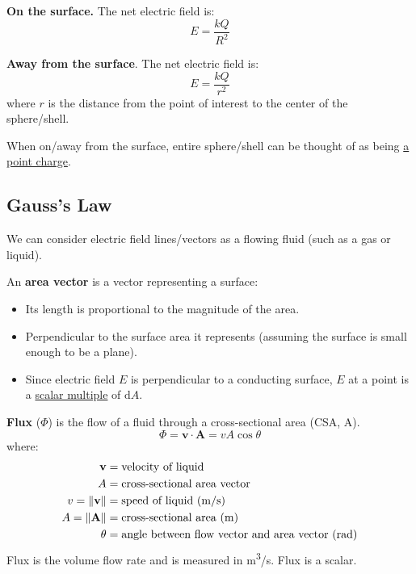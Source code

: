 \documentclass{article}
\newcommand{\definition}[1]{\begin{tcolorbox}[colback=red!5!white,colframe=red!75!black,parbox=false] #1 \end{tcolorbox}}
\newcommand{\theorem}[2]{\begin{tcolorbox}[title={#1},colback=blue!5!white,colframe=blue!75!black,parbox=false] #2 \end{tcolorbox}}
\newcommand{\defitheorem}[2]{\begin{tcolorbox}[title={#1},colback=violet!5!white,colframe=violet!75!black,parbox=false] #2 \end{tcolorbox}}
\begin{document}
\textbf{On the surface.} The net electric field is:
\begin{equation*}
	E=\frac{kQ}{R^2}
\end{equation*}

\textbf{Away from the surface}. The net electric field is:
\begin{equation*}
	E=\frac{kQ}{r^2}
\end{equation*}
where $r$ is the distance from the point of interest to the center of the sphere/shell.

\theorem*{
	When on/away from the surface, entire sphere/shell can be thought of as being \ul{a point charge}.
}

\subsection{Gauss's Law}

We can consider electric field lines/vectors as a flowing fluid (such as a gas or liquid).

\definition{
	An \textbf{area vector} is a vector representing a surface:
	\begin{itemize}
		\item Its length is proportional to the magnitude of the area.
		\item Perpendicular to the surface area it represents (assuming the surface is small enough to be a plane).
		\item Since electric field $E$ is perpendicular to a conducting surface, $E$ at a point is a \ul{scalar multiple} of $\mathrm{d}A$.
	\end{itemize}
}
\defitheorem{Flux}{
	\textbf{Flux} ($\Phi$) is the flow of a fluid through a cross-sectional area (CSA, A).
	\begin{equation*}
	    \Phi=\mathbf v\cdot \mathbf A=vA\cos\theta
	\end{equation*}
	where:
	\begin{align*}
		\mathbf v&=\text{velocity of liquid} \\
		A&=\text{cross-sectional area vector} \\
		v=\lVert \mathbf v \rVert &=\text{speed of liquid (\si{m/s})} \\
		A=\lVert \mathbf A \rVert &=\text{cross-sectional area (\si{m})} \\
		\theta&=\text{angle between flow vector and area vector (\si{\radian})}
	\end{align*}
	Flux is the volume flow rate and is measured in \si{m^3/s}. Flux is a scalar.
}
\end{document}
